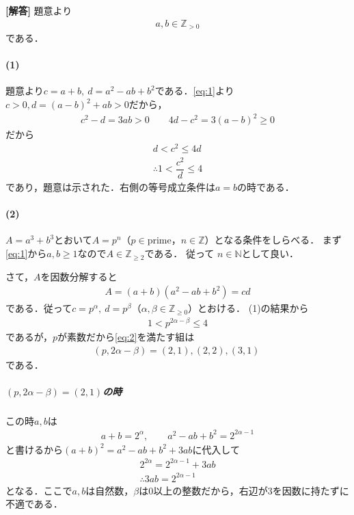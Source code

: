 \documentclass[../../main.tex]{subfiles}
\begin{document}
\begin{oframed}
  
\end{oframed}

{\bf [解答]}
題意より
\begin{align}
  a,b\in\mathbb{Z}_{>0} \label{eq:1}
\end{align}
である．

\paragraph{(1)}
題意より$c=a+b,\ d=a^2-ab+b^2$である．\cref{eq:1}より$c>0, d=(a-b)^2+ab>0$だから，
\begin{align}
  c^2-d=3ab>0 \qquad 4d-c^2=3(a-b)^2\ge 0
\end{align}
だから
\begin{align}
  d < c^2 \le 4d \\
  \therefore
  1<\dfrac{c^2}{d}\le 4
\end{align}
であり，題意は示された．右側の等号成立条件は$a=b$の時である．

\paragraph{(2)}
$A=a^3+b^3$とおいて$A=p^n$（$p\in\text{prime}$，$n\in\mathbb{Z}$）となる条件をしらべる．
まず\cref{eq:1}から$a,b \ge 1$なので$A\in\mathbb{Z}_{\ge2}$である．
従って $n\in\mathbb{N}$として良い．

さて，$A$を因数分解すると
\begin{align}
  A = (a+b)(a^2-ab+b^2) = cd
\end{align}
である．従って$c=p^\alpha,\ d=p^\beta$（$\alpha,\beta\in\mathbb{Z}_{\ge0}$）とおける．
(1)の結果から
\begin{align}
  1<p^{2\alpha-\beta}\le4 \label{eq:2}
\end{align}
であるが，$p$が素数だから\cref{eq:2}を満たす組は
\begin{align}
  (p,2\alpha-\beta)=(2,1), (2,2), (3,1)\ \label{eq:3}
\end{align}
である．

\subparagraph{$(p,2\alpha-\beta)=(2,1)$の時}

この時$a,b$は
\begin{align}
  a+b=2^\alpha, \qquad a^2-ab+b^2=2^{2\alpha-1}
\end{align}
と書けるから$(a+b)^2=a^2-ab+b^2+3ab$に代入して
\begin{align}
  2^{2\alpha} = 2^{2\alpha-1} + 3ab \\
  \therefore
  3ab = 2^{2\alpha-1}
\end{align}
となる．ここで$a,b$は自然数，$\beta$は$0$以上の整数だから，右辺が$3$を因数に持たずに不適である．
\end{document}
